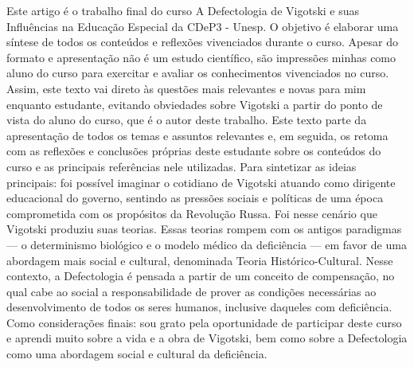 \documentclass{../../common-shared/cls/Article_Class_RevInfor}
\begin{document}
\newcommand{\Vig}{Vigotski}
\newcommand{\Obtiene}{Obutchenie}


\begin{resumo}
Este artigo é o trabalho final do curso A Defectologia de \Vig{} e suas Influências na Educação Especial da CDeP3 - Unesp. O objetivo é elaborar uma síntese de todos os conteúdos e reflexões vivenciados durante o curso. Apesar do formato e apresentação não é um estudo científico, são impressões minhas como aluno do curso para exercitar e avaliar os conhecimentos vivenciados no curso.
Assim, este texto vai direto às questões mais relevantes e novas para mim enquanto estudante, evitando obviedades sobre \Vig{} a partir do ponto de vista do aluno do curso, que é o autor deste trabalho.
Este texto parte da apresentação de todos os temas e assuntos relevantes e, em seguida, os retoma com as reflexões e conclusões próprias deste estudante sobre os conteúdos do curso e as principais referências nele utilizadas.
Para sintetizar as ideias principais: foi possível imaginar o cotidiano de \Vig{} atuando como dirigente educacional do governo, sentindo as pressões sociais e políticas de uma época comprometida com os propósitos da Revolução Russa. Foi nesse cenário que \Vig{} produziu suas teorias.
Essas teorias rompem com os antigos paradigmas — o determinismo biológico e o modelo médico da deficiência — em favor de uma abordagem mais social e cultural, denominada Teoria Histórico-Cultural. Nesse contexto, a Defectologia é pensada a partir de um conceito de compensação, no qual cabe ao social a responsabilidade de prover as condições necessárias ao desenvolvimento de todos os seres humanos, inclusive daqueles com deficiência.
Como considerações finais: sou grato pela oportunidade de participar deste curso e aprendi muito sobre a vida e a obra de \Vig{}, bem como sobre a Defectologia como uma abordagem social e cultural da deficiência.
\end{resumo}
\end{document}
